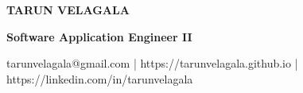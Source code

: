 \begin{center}
    {\LARGE\textbf{TARUN VELAGALA}}\\

    \vspace{0.125 cm}

    {\textbf{ Software Application Engineer II }}\\

    \vspace{0.125 cm}

    \textnormal{tarunvelagala@gmail.com} |
    \textnormal{https://tarunvelagala.github.io} |
    \textnormal{https://linkedin.com/in/tarunvelagala}
\end{center}
